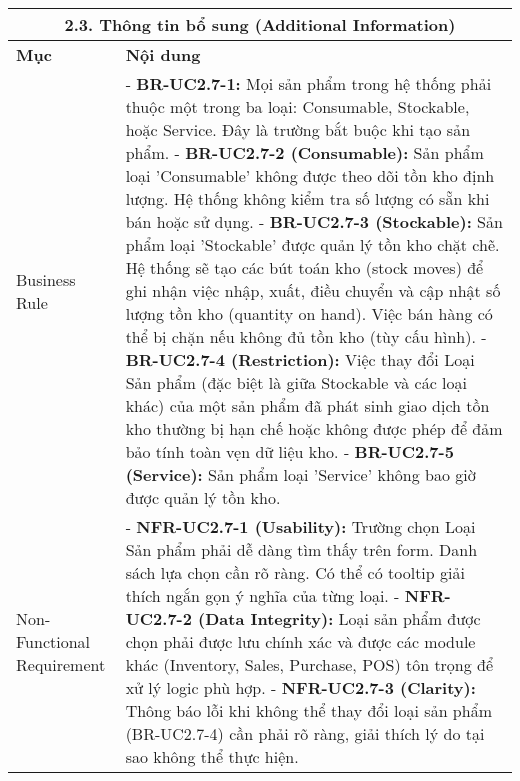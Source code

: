 \begin{longtable}{|m{4cm}|p{11cm}|}
\hline
\multicolumn{2}{|c|}{\textbf{2.3. Thông tin bổ sung (Additional Information)}} \\
\hline
\textbf{Mục} & \textbf{Nội dung} \\
\hline
Business Rule & - \textbf{BR-UC2.7-1:} Mọi sản phẩm trong hệ thống phải thuộc một trong ba loại: Consumable, Stockable, hoặc Service. Đây là trường bắt buộc khi tạo sản phẩm. \newline - \textbf{BR-UC2.7-2 (Consumable):} Sản phẩm loại 'Consumable' không được theo dõi tồn kho định lượng. Hệ thống không kiểm tra số lượng có sẵn khi bán hoặc sử dụng. \newline - \textbf{BR-UC2.7-3 (Stockable):} Sản phẩm loại 'Stockable' được quản lý tồn kho chặt chẽ. Hệ thống sẽ tạo các bút toán kho (stock moves) để ghi nhận việc nhập, xuất, điều chuyển và cập nhật số lượng tồn kho (quantity on hand). Việc bán hàng có thể bị chặn nếu không đủ tồn kho (tùy cấu hình). \newline - \textbf{BR-UC2.7-4 (Restriction):} Việc thay đổi Loại Sản phẩm (đặc biệt là giữa Stockable và các loại khác) của một sản phẩm đã phát sinh giao dịch tồn kho thường bị hạn chế hoặc không được phép để đảm bảo tính toàn vẹn dữ liệu kho. \newline - \textbf{BR-UC2.7-5 (Service):} Sản phẩm loại 'Service' không bao giờ được quản lý tồn kho. \\
\hline
Non-Functional Requirement & - \textbf{NFR-UC2.7-1 (Usability):} Trường chọn Loại Sản phẩm phải dễ dàng tìm thấy trên form. Danh sách lựa chọn cần rõ ràng. Có thể có tooltip giải thích ngắn gọn ý nghĩa của từng loại. \newline - \textbf{NFR-UC2.7-2 (Data Integrity):} Loại sản phẩm được chọn phải được lưu chính xác và được các module khác (Inventory, Sales, Purchase, POS) tôn trọng để xử lý logic phù hợp. \newline - \textbf{NFR-UC2.7-3 (Clarity):} Thông báo lỗi khi không thể thay đổi loại sản phẩm (BR-UC2.7-4) cần phải rõ ràng, giải thích lý do tại sao không thể thực hiện. \\
\hline

\end{longtable}

